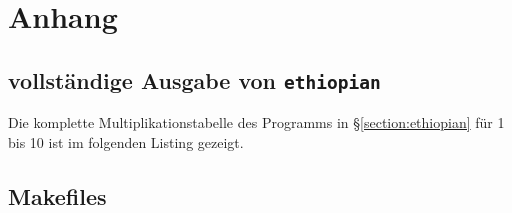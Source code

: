 \chapter{Anhang}


\section{vollständige Ausgabe von \texttt{ethiopian}}

Die komplette Multiplikationstabelle des Programms in §\ref{section:ethiopian} für 1 bis 10 ist im folgenden Listing gezeigt.


\section{Makefiles}





